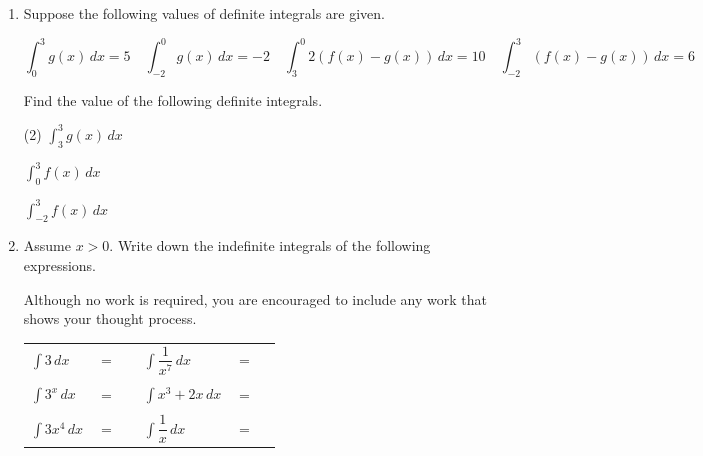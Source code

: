 \documentclass[11pt]{article}
\newcommand{\tasksA}[2]{\begin{tasks}(#1) #2 \end{tasks}} %
\begin{document}
\begin{enumerate}
\item Suppose the following values of definite integrals are given.

\[
\int_{0}^{3} g(x)\,dx = 5
\quad
\int_{-2}^{0} g(x)\,dx = -2
\quad
\int_{3}^{0} 2(f(x) - g(x))\,dx = 10
\quad
\int_{-2}^{3} (f(x) - g(x))\,dx = 6
\]

Find the value of the following definite integrals.

\tasksA{2}{
\task $\displaystyle \int_{3}^{3} g(x)\, dx$

\task $\displaystyle \int_{0}^{3} f(x)\, dx$

\vspace{7cm}

\task $\displaystyle \int_{-2}^{3} f(x)\, dx$
}

\newpage


\item Assume $x>0$. Write down the indefinite integrals of the following expressions. 

Although no work is required, you are encouraged to include any work that shows your thought process. 


\begin{center}
        \begin{tabular}{l c r l c r}
            $\displaystyle\int 3\,dx$ & $=$ & \rule[-8pt]{1.5in}{0.4pt} &
                \vspace{5cm}

            $\displaystyle\int \dfrac{1}{x^7} \,dx$ & $=$ & \rule[-8pt]{1.5in}{0.4pt}\\[1in]
                \vspace{5cm}

            $\displaystyle\int 3^x\,dx$ & $=$ & \rule[-8pt]{1.5in}{0.4pt}&
            $\displaystyle\int x^3 + 2x\,dx$ & $=$ & \rule[-8pt]{1.5in}{0.4pt}\\[1in]
            $\displaystyle\int 3x^4 \,dx$ & $=$ & \rule[-8pt]{1.5in}{0.4pt} & 
            $\displaystyle\int \dfrac{1}{x} \,dx$ & $=$ & \rule[-8pt]{1.5in}{0.4pt}\\[0.3in]
        \end{tabular}
\end{center}


\end{enumerate}
\end{document}
